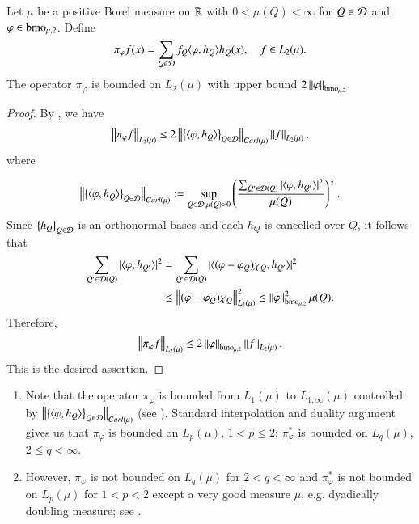 \documentclass[leqno]{amsart}
\begin{document}
\begin{lemma}\label{L2 estimate paraproduct}
Let $\mu$ be a positive Borel measure on ${\mathbb R}$ with $0<\mu(Q)<\infty$ for $Q\in{\mathcal D}$ and $\varphi\in{\rm bmo}_{\mu,2}$. Define
\begin{align*}
\pi_{\varphi}f(x)
=\sum_{Q\in{\mathcal D}}f_{Q}\langle \varphi,h_{Q} \rangle h_{Q}(x),\quad f\in L_{2}(\mu).
\end{align*}
The operator $\pi_{\varphi}$ is bounded on $L_{2}(\mu)$ with upper bound $2\left\| \varphi \right\|_{{\rm bmo}_{\mu,2}}$.
\end{lemma}
\begin{proof}
By \cite[Lemma 5.10]{LMP2014}, we have
\begin{align*}
\left\| \pi_{\varphi}f \right\|_{L_{2}(\mu)}
\leq2\left\| \left\{ \langle \varphi,h_{Q} \rangle \right\}_{Q\in{\mathcal D}} \right\|_{Carl(\mu)}\left\| f \right\|_{L_{2}(\mu)},
\end{align*}
where 
\begin{align*}
\left\| \left\{ \langle \varphi,h_{Q} \rangle \right\}_{Q\in{\mathcal D}} \right\|_{Carl(\mu)}:=
\sup_{Q\in{\mathcal D},\mu(Q)>0}\left(\frac{\sum_{Q'\in{\mathcal D}(Q)}|\langle \varphi,h_{Q'} \rangle|^{2}}{\mu(Q)}\right)^{\frac{1}{2}}.
\end{align*}
Since $\left\{ h_{Q} \right\}_{Q\in{\mathcal D}}$ is an orthonormal bases and each $h_{Q}$ is cancelled over $Q$, it follows that
\begin{align*}
\sum_{Q'\in{\mathcal D}(Q)}|\langle \varphi,h_{Q'} \rangle|^{2}
&=\sum_{Q'\in{\mathcal D}(Q)}|\langle (\varphi-\varphi_{Q})\chi_{Q},h_{Q'} \rangle|^{2}\\
&\leq\left\| (\varphi-\varphi_{Q})\chi_{Q} \right\|_{L_{2}(\mu)}^{2}\leq\left\| \varphi \right\|_{{\rm bmo}_{\mu,2}}^{2}\mu(Q).
\end{align*}
Therefore, $$\left\| \pi_{\varphi}f \right\|_{L_{2}(\mu)}
\leq2\left\| \varphi \right\|_{{\rm bmo}_{\mu,2}}\left\| f \right\|_{L_{2}(\mu)}.$$
This is the desired assertion.

\end{proof}


\begin{remark}\label{remark on paraproduct}
\begin{enumerate}[\rm(1)]
\item Note that the operator $\pi_{\varphi}$ is bounded from $L_{1}(\mu)$ to $L_{1,\infty}(\mu)$ controlled by $\left\| \left\{ \langle \varphi,h_{Q} \rangle \right\}_{Q\in{\mathcal D}} \right\|_{Carl(\mu)}$ (see \cite[Theorem 5.8 (i)]{LMP2014}).
Standard interpolation and duality argument gives us that  $\pi_{\varphi}$ is bounded on $L_{p}(\mu)$, $1<p\leq2$; $\pi_{\varphi}^{*}$ is bounded on $L_{q}(\mu)$, $2\leq q<\infty$. 

\item However, $\pi_{\varphi}$ is not bounded on $L_{q}(\mu)$ for $2< q<\infty$ and $\pi_{\varphi}^{*}$ is not bounded on $L_{p}(\mu)$ for $1<p<2$ except a very good measure $\mu$, e.g. dyadically doubling measure; see \cite[Theorem 5.8 (iii)]{LMP2014}.
\end{enumerate}
\end{remark}
\end{document}
